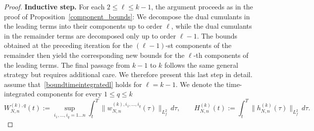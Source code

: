 \documentclass[pdflatex,sn-mathphys-num]{sn-jnl}
\theoremstyle{thmstyleone}%
\theoremstyle{thmstyletwo}%
\theoremstyle{thmstylethree}%
\begin{document}
\begin{proof}
\medskip

\noindent\textbf{Inductive step.}
For each \(2\leq \ell\leq k-1\), the argument proceeds as in the proof of Proposition~\ref{component_bounds}: We decompose the dual cumulants in the leading terms into their components up to order \(\ell\), while the dual cumulants in the remainder terms are decomposed only up to order \(\ell-1\). The bounds obtained at the preceding iteration for the \((\ell-1)\)-st components of the remainder then yield the corresponding new bounds for the \(\ell\)-th components of the leading terms. The final passage from \(k-1\) to \(k\) follows the same general strategy but requires additional care. We therefore present this last step in detail. assume that~\eqref{boundtimeintegratedl} holds for \(\ell=k-1\). We denote the time-integrated components for every $1 \le q \le k$
\[
W^{(k),q}_{N,n}(t)
:= \sup_{i_1,\ldots,i_q=1\dots n} \int_t^T \|w^{(k),i_1,\dots,i_q}_{N,n}(\tau)\|_{L^2_f}\,d \tau,
\qquad
H^{(k)}_{N,n}(t)
:= \int_t^T \|h^{(k)}_{N,n}(\tau)\|_{L^2_f}\,d\tau.
\]


\medskip


\end{proof}
\end{document}
